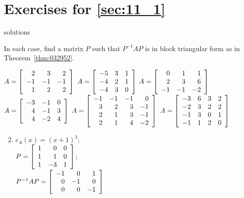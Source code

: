 \section*{Exercises for \ref{sec:11_1}}

\begin{Filesave}{solutions}
\end{Filesave}

\begin{multicols}{2}
\begin{ex}
In each case, find a matrix $P$ such that $P^{-1}AP$ is in block triangular form as in Theorem~\ref{thm:032952}.
\begin{exenumerate}
\exitem $A = \left[ \begin{array}{rrr}
2 & 3 & 2 \\
-1 & -1 & -1 \\
1 & 2 & 2
\end{array} \right]$
\exitem $A = \left[ \begin{array}{rrr}
-5 & 3 & 1 \\
-4 & 2 & 1 \\
-4 & 3 & 0
\end{array} \right]$
\exitem $A = \left[ \begin{array}{rrr}
0 & 1 & 1 \\
2 & 3 & 6 \\
-1 & -1 & -2
\end{array} \right]$
\exitem $A = \left[ \begin{array}{rrr}
-3 & -1 & 0 \\
4 & -1 & 3 \\
4 & -2 & 4
\end{array} \right]$
\exitem* $A = \left[ \begin{array}{rrrr}
-1 & -1 & -1 & 0 \\
3 & 2 & 3 & -1 \\
2 & 1 & 3 & -1 \\
2 & 1 & 4 & -2
\end{array} \right]$
\exitem* $A = \left[ \begin{array}{rrrr}
-3 & 6 & 3 & 2 \\
-2 & 3 & 2 & 2 \\
-1 & 3 & 0 & 1 \\
-1 & 1 & 2 & 0
\end{array} \right]$
\end{exenumerate}
\begin{sol}
\begin{enumerate}[label={\alph*.}]
\setcounter{enumi}{1}
\item $c_A(x) = (x + 1)^3$; \\ $P = \left[ \begin{array}{rrr}
1 & 0 & 0 \\
1 & 1 & 0 \\
1 & -3 & 1
\end{array} \right]$; \\ $P^{-1}AP = \left[ \begin{array}{rrr}
-1 & 0 & 1 \\
0 & -1 & 0 \\
0 & 0 & -1
\end{array} \right]$


\end{enumerate}
\end{sol}
\end{ex}
\end{multicols}
